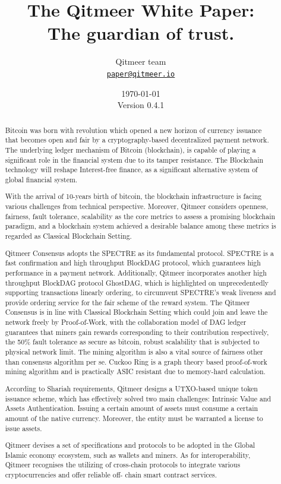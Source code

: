 \documentclass[a4paper,11pt]{article}
\title{\LARGE The Qitmeer White Paper:\\
	\Large The guardian of trust.}
\author{
	Qitmeer team\\
		\small\href{mailto:paper@qitmeer.io}
			{\nolinkurl{paper@qitmeer.io}}
	}
\date{\today\\\small Version 0.4.1}
\newcommand{\watermark}[3]{\AddToShipoutPictureBG{
	\parbox[b][\paperheight]{\paperwidth}{
		\vfill%
		\centering%
	\tikz[remember picture, overlay]%
	  \node [rotate = #1, scale = #2] at (current page.center)%
	      {\textcolor{gray!80!cyan!30}{#3}};
	  \vfill}}}
\begin{document}
\clearpage
\pagestyle{plain}

\maketitle


\begin{abstract}
Bitcoin\cite{bitcoin} was born with revolution which opened a new horizon of currency issuance that becomes open and fair by a cryptography-based decentralized payment network. The underlying ledger mechanism of Bitcoin (blockchain), is capable of playing a significant role in the financial system due to its tamper resistance. The Blockchain technology will reshape Interest-free finance, as a significant alternative system of global financial system.

With the arrival of 10-years birth of bitcoin, the blockchain infrastructure is facing various challenges from technical perspective. Moreover, Qitmeer considers openness, fairness, fault tolerance, scalability as the core metrics to assess a promising blockchain paradigm, and a blockchain system achieved a desirable balance among these metrics is regarded as Classical Blockchain Setting.

Qitmeer Consensus adopts the SPECTRE\cite{SPECTRE}  as its fundamental protocol. SPECTRE is a fast confirmation and high throughput BlockDAG protocol, which guarantees high performance in a payment network. Additionally, Qitmeer incorporates  another high throughput BlockDAG protocol   GhostDAG\cite{GhostDAG}, which is highlighted on unprecedentedly supporting transactions linearly ordering, to circumvent SPECTRE’s weak liveness and provide ordering service for the fair scheme of the reward system. The Qitmeer Consensus is in line with Classical Blockchain Setting which could join and leave the network freely by Proof-of-Work, with the collaboration model of DAG ledger guarantees that miners gain rewards corresponding to their contribution respectively, the  50\% fault tolerance as secure as bitcoin, robust scalability that is subjected to physical network limit. The mining algorithm is also a vital source of fairness other than consensus algorithm per se. Cuckoo Ring is a graph theory based proof-of-work mining algorithm and is practically ASIC resistant due to memory-hard calculation. 

According to Shariah requirements, Qitmeer designs a UTXO-based unique token issuance scheme, which has effectively solved two main challenges: Intrinsic Value and Assets Authentication. Issuing a certain amount of assets must consume a certain amount of the native currency. Moreover, the entity must be warranted a license to issue assets. 

Qitmeer devises a set of specifications and protocols to be adopted in the Global Islamic economy ecosystem, such as wallets and miners. As for interoperability, Qitmeer recognises the utilizing of cross-chain protocols to integrate various cryptocurrencies and offer reliable off- chain smart contract services.

\end{abstract}
\end{document}
